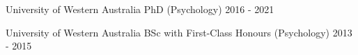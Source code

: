 

\begin{cventries}

  \cventry
    {University of Western Australia} %
    {PhD (Psychology)} %
    {}%
    {2016 - 2021} %
    {
    }

\vspace{-4mm}

  \cventry
    {University of Western Australia} %
    {BSc with First-Class Honours (Psychology)} %
    {} %
    {2013 - 2015} %
    {}

\end{cventries}
